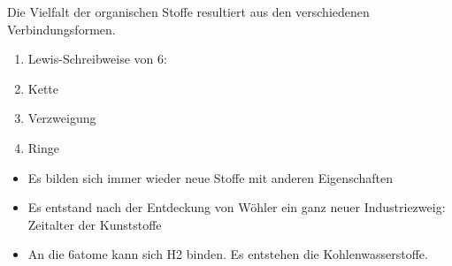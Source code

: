 Die Vielfalt der organischen Stoffe resultiert aus den verschiedenen Verbindungsformen.
\begin{multicols}{2}
\begin{enumerate}
	\item Lewis-Schreibweise von \ac{6}:~ 
	\item Kette \\[0.8ex]
	\item Verzweigung \\[0.8ex]
	\item Ringe \\[0.8ex]
\end{enumerate}
\begin{itemize}
	\item Es bilden sich immer wieder neue Stoffe mit anderen Eigenschaften
	\item Es entstand nach der Entdeckung von Wöhler ein ganz neuer Industriezweig:
		Zeitalter der Kunststoffe
\end{itemize}
\end{multicols}

\begin{itemize}
	\item An die \acl{6}atome kann sich \ac{H2} binden. Es entstehen die
		Kohlenwasserstoffe.
\end{itemize}



